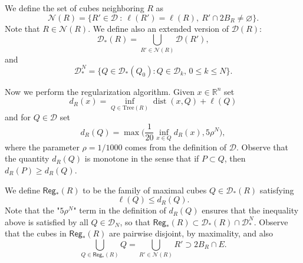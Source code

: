 \documentclass[11pt,reqno]{amsart}
\newcommand{\Tr}{\mathrm{Tree}}
\def\dist{\mathop\mathrm{dist}} 						%
\newcommand{\fr}[2]{\frac{#1}{#2}}
\theoremstyle{definition}
\theoremstyle{remark}
\numberwithin{equation}{section}
\newcommand{\R}{\mathbb{R}}
\newcommand{\nbd}{\mathcal{N}}
\newcommand{\DD}{\mathcal{D}}
\newcommand{\Reg}{\mathsf{Reg}_*}
\theoremstyle{theorem}
\theoremstyle{definition}
\theoremstyle{remark}
\numberwithin{equation}{section}
\begin{document}
	We define the set of cubes neighboring $R$ as
	\begin{equation}\label{eq:defnbd}
	\nbd(R) = \{R'\in\DD\ :\ \ell(R')=\ell(R),\ R'\cap 2B_R\neq\varnothing \}.
	\end{equation}
	Note that $R\in\nbd(R)$. We define also an extended version of $\DD(R)$:
	\begin{equation*}
	\DD_*(R) = \bigcup_{R'\in\nbd(R)}\DD(R'),
	\end{equation*}
    and
    \begin{equation*}
        \DD_*^N = \{Q\in\DD_*(Q_0): Q\in\DD_k,\, 0\le k\le N\}.
    \end{equation*}
	
	Now we perform the regularization algorithm. Given $x\in\R^n$ set
	\begin{equation*}
	d_R(x) = \inf_{Q\in\Tr(R)} \dist(x,Q)+\ell(Q)
	\end{equation*}
	and for $Q\in\DD$ set
	\begin{equation*}
	d_R(Q)=	\max\big(\fr{1}{20}\inf_{x\in Q} d_R(x), 5\rho^N\big),
	\end{equation*}
	where the parameter $\rho=1/1000$ comes from the definition of $\DD$. Observe that the quantity $d_R(Q)$ is monotone in the sense that if $P\subset Q$, then $d_R(P)\ge d_R(Q)$. 	
	
	We define $\Reg(R)$ to be the family of maximal cubes $Q\in\DD_*(R)$ satisfying
	\begin{equation}\label{eq:defreg}
	\ell(Q)\le d_R(Q).
	\end{equation}	
	Note that the "$5\rho^N$" term in the definition of $d_R(Q)$ ensures that the inequality above is satisfied by all $Q\in\DD_N$, so that $\Reg(R)\subset\DD_*(R)\cap\DD_*^N$. Observe that the cubes in $\Reg(R)$ are pairwise disjoint, by maximality, and also
	\begin{equation}\label{eq:Regcovers}
	\bigcup_{Q\in\Reg(R)}Q=\bigcup_{R'\in\nbd({R})}R'\supset 2B_R\cap E.
	\end{equation} 
	 
\end{document}
